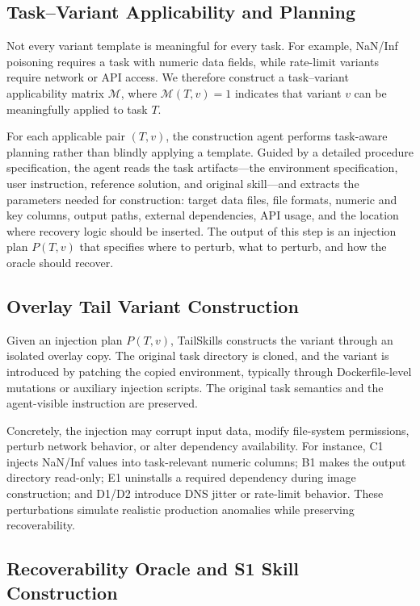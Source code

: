 \documentclass[11pt]{article}
\begin{document}
\subsection{Task--Variant Applicability and Planning}

Not every variant template is meaningful for every task. For example, NaN/Inf poisoning requires a task with numeric data fields, while rate-limit variants require network or API access. We therefore construct a task--variant applicability matrix $\mathcal{M}$, where $\mathcal{M}(T,v)=1$ indicates that variant $v$ can be meaningfully applied to task $T$.

For each applicable pair $(T,v)$, the construction agent performs task-aware planning rather than blindly applying a template. Guided by a detailed procedure specification, the agent reads the task artifacts---the environment specification, user instruction, reference solution, and original skill---and extracts the parameters needed for construction: target data files, file formats, numeric and key columns, output paths, external dependencies, API usage, and the location where recovery logic should be inserted. The output of this step is an injection plan $P(T,v)$ that specifies where to perturb, what to perturb, and how the oracle should recover.

\subsection{Overlay Tail Variant Construction}

Given an injection plan $P(T,v)$, TailSkills constructs the variant through an isolated overlay copy. The original task directory is cloned, and the variant is introduced by patching the copied environment, typically through Dockerfile-level mutations or auxiliary injection scripts. The original task semantics and the agent-visible instruction are preserved.

Concretely, the injection may corrupt input data, modify file-system permissions, perturb network behavior, or alter dependency availability. For instance, C1 injects NaN/Inf values into task-relevant numeric columns; B1 makes the output directory read-only; E1 uninstalls a required dependency during image construction; and D1/D2 introduce DNS jitter or rate-limit behavior. These perturbations simulate realistic production anomalies while preserving recoverability.

\subsection{Recoverability Oracle and S1 Skill Construction}
\end{document}

